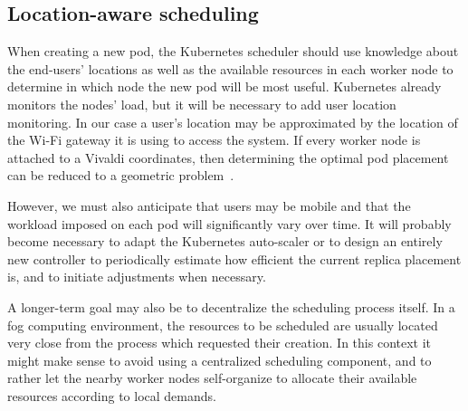\documentclass[letterpaper,twocolumn,10pt]{article}
\let\origref\ref
\def\ref#1{\textbf{\origref{#1}}}
\begin{document}


\subsection{Location-aware scheduling}

When creating a new pod, the Kubernetes scheduler should use knowledge
about the end-users' locations as well as the available resources in
each worker node to determine in which node the new pod will be most
useful. Kubernetes already monitors the nodes' load, but it will be
necessary to add user location monitoring. In our case a user's
location may be approximated by the location of the Wi-Fi gateway it
is using to access the system. If every worker node is attached to a 
Vivaldi coordinates, then determining the optimal pod placement can be
reduced to a geometric problem~\cite{szymaniak2006}.

However, we must also anticipate that users may be mobile and that
the workload imposed on each pod will significantly vary over time. It
will probably become necessary to adapt the Kubernetes auto-scaler or
to design an entirely new controller to periodically estimate how
efficient the current replica placement is, and to initiate
adjustments when necessary.

A longer-term goal may also be to decentralize the scheduling process
itself. In a fog computing environment, the resources to be scheduled
are usually located very close from the process which requested their
creation. In this context it might make sense to avoid using a
centralized scheduling component, and to rather let the nearby worker
nodes self-organize to allocate their available resources according to
local demands.


\end{document}
